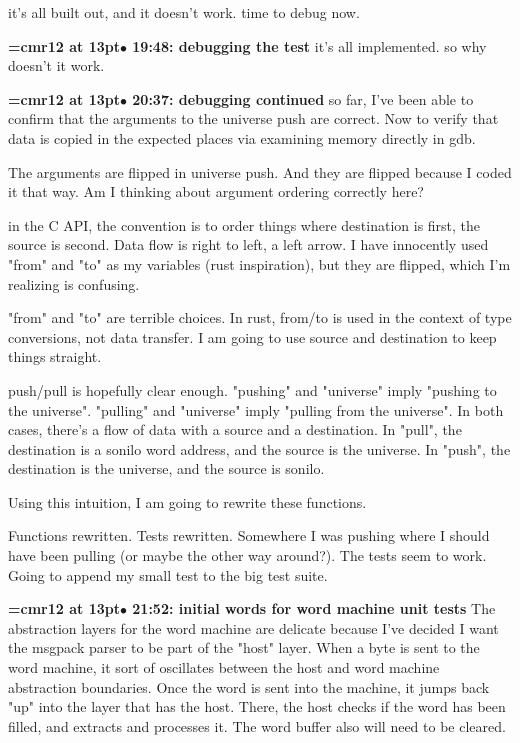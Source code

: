 it's all built out, and it doesn't work. time to debug now.
\par

{\smallskip\noindent\bf\font\titlefont=cmr12 at 13pt\titlefont $\bullet$ 19:48: debugging the test}\smallskip
it's all implemented. so why doesn't it work.
\par

{\smallskip\noindent\bf\font\titlefont=cmr12 at 13pt\titlefont $\bullet$ 20:37: debugging continued}\smallskip
so far, I've been able to confirm that the arguments to the universe push are correct. Now to verify that data is copied in the expected places via examining memory directly in gdb.
\par

The arguments are flipped in universe push. And they are flipped because I coded it that way. Am I thinking about argument ordering correctly here?
\par

in the C API, the convention is to order things where destination is first, the source is second. Data flow is right to left, a left arrow. I have innocently used "from" and "to" as my variables (rust inspiration), but they are flipped, which I'm realizing is confusing.
\par

"from" and "to" are terrible choices. In rust, from/to is used in the context of type conversions, not data transfer. I am going to use source and destination to keep things straight.
\par

push/pull is hopefully clear enough. "pushing" and "universe" imply "pushing to the universe". "pulling" and "universe" imply "pulling from the universe". In both cases, there's a flow of data with a source and a destination. In "pull", the destination is a sonilo word address, and the source is the universe. In "push", the destination is the universe, and the source is sonilo.
\par

Using this intuition, I am going to rewrite these functions.
\par

Functions rewritten. Tests rewritten. Somewhere I was pushing where I should have been pulling (or maybe the other way around?). The tests seem to work. Going to append my small test to the big test suite.
\par

{\smallskip\noindent\bf\font\titlefont=cmr12 at 13pt\titlefont $\bullet$ 21:52: initial words for word machine unit tests}\smallskip
The abstraction layers for the word machine are delicate because I've decided I want the msgpack parser to be part of the "host" layer. When a byte is sent to the word machine, it sort of oscillates between the host and word machine abstraction boundaries. Once the word is sent into the machine, it jumps back "up" into the layer that has the host. There, the host checks if the word has been filled, and extracts and processes it. The word buffer also will need to be cleared.
\par

